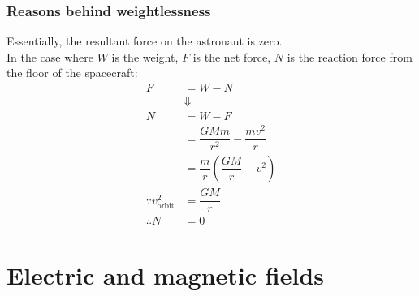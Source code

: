 \documentclass[a4paper,12pt]{article}
\begin{document}
\subsubsection*{Reasons behind weightlessness}
Essentially, the resultant force on the astronaut is zero. \\
In the case where $W$ is the weight, $F$ is the net force, $N$ is the reaction force from the floor of the spacecraft:
\[
\begin{aligned}
  F&=W-N\\
  &\Downarrow\\
  N&=W-F\\
  &=\dfrac{GMm}{r^2}-\dfrac{mv^2}{r}\\
  &=\dfrac{m}{r}\left(\dfrac{GM}{r}-v^2\right)\\
  \because v^2_\text{orbit}&=\dfrac{GM}{r}\\
  \therefore N&=0
\end{aligned}
\]
\section{Electric and magnetic fields}
\end{document}
